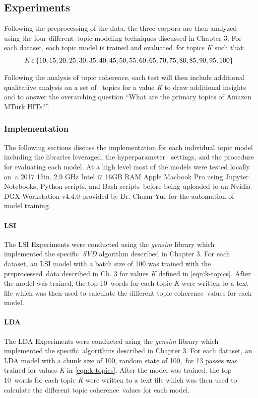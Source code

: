 \documentclass[letterpaper,12pt]{article}
\begin{document}
\subsection{Experiments}
Following the preprocessing of the data, the three corpora are then analyzed using the four different\
topic modeling techniques discussed in Chapter 3. For each dataset, each topic model is trained and evaluated\
for topics \emph{K} such that:
\begin{eqnarray}
	\label{eqn:k-topics}
	\emph{K} \: \epsilon \: \{ 10, 15, 20, 25, 30, 35, 40, 45, 50, 55, 60, 65, 70, 75, 80, 85, 90, 95, 100 \}
\end{eqnarray}

Following the analysis of topic coherence, each test will then include additional qualitative analysis on a set of \
 topics for a value \emph{K} to draw additional insights and to answer the overarching question ``What are the primary topics of Amazon MTurk HITs?''.
\subsubsection{Implementation}
The following sections discuss the implementation for each individual topic model including the libraries leveraged, the hyperparameter \
settings, and the procedure for evaluating each model. At a high level most of the models were tested locally on\
a 2017 15in. 2.9 GHz Intel i7 16GB RAM Apple Macbook Pro using Jupyter Notebooks, Python scripts, and Bash scripts\
before being uploaded to an Nvidia DGX Workstation v4.4.0 provided by Dr. Chuan Yue for the automation of model training. 
\paragraph{LSI}
The LSI Experiments were conducted using the \emph{gensim} library \cite{gensim} which implemented the specific\
\emph{SVD} algorithm described in Chapter 3. For each dataset, an LSI model with a batch size of 100 was trained with the preprocessed\
data described in Ch. 3 for values \emph{K} defined in \ref{eqn:k-topics}. After the model was trained, the top 10\
words for each topic \emph{K} were written to a text file which was then used to calculate the different topic coherence\
values for each model.

\paragraph{LDA}
The LDA Experiments were conducted using the \emph{gensim} library \cite{gensim} which implemented the specific\
algorithms described in Chapter 3. For each dataset, an LDA model with a chunk size of 100, random state of 100,\
for 13 passes was trained for values \emph{K} in \ref{eqn:k-topics}. After the model was trained, the top 10\
words for each topic \emph{K} were written to a text file which was then used to calculate the different topic coherence\
values for each model.
\end{document}
